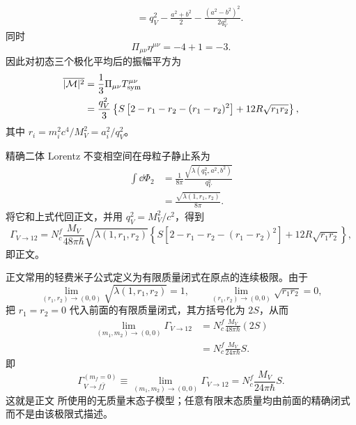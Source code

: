 \begin{derivation}[有质量费米子末态的矢量衰变宽度]
\begin{align*}
 &\quad=q_V^2-\frac{a^2+b^2}{2}
 -\frac{(a^2-b^2)^2}{2q_V^2}.
\end{align*}
同时
\begin{equation*}
 \Pi_{\mu\nu}\eta^{\mu\nu}=-4+1=-3.
\end{equation*}
因此对初态三个极化平均后的振幅平方为
\begin{align*}
 \overline{|\mathcal M|^2}
 &=\frac13\Pi_{\mu\nu}T_{\rm sym}^{\mu\nu}\\
 &=\frac{q_V^2}{3}
 \left\{
 S\left[2-r_1-r_2-(r_1-r_2)^2\right]
 +12R\sqrt{r_1r_2}
 \right\},
\end{align*}
其中 $r_i=m_i^2c^4/M_V^2=a_i^2/q_V^2$。

精确二体 Lorentz 不变相空间在母粒子静止系为
\begin{align*}
 \int\dd\Phi_2
 &=\frac{1}{8\pi}
 \frac{\sqrt{\lambda(q_V^2,a^2,b^2)}}{q_V^2}\\
 &=\frac{\sqrt{\lambda(1,r_1,r_2)}}{8\pi}.
\end{align*}
将它和上式代回正文，并用
$q_V^2=M_V^2/c^2$，得到
\begin{equation*}
 \Gamma_{V\to12}
 =N_c^f\frac{M_V}{48\pi\hbar}\sqrt{\lambda(1,r_1,r_2)}
 \left\{
 S\left[2-r_1-r_2-(r_1-r_2)^2\right]
 +12R\sqrt{r_1r_2}
 \right\},
\end{equation*}
即正文。

正文常用的轻费米子公式定义为有限质量闭式在原点的连续极限。由于
\begin{equation*}
 \lim_{(r_1,r_2)\to(0,0)}\sqrt{\lambda(1,r_1,r_2)}=1,
 \qquad
 \lim_{(r_1,r_2)\to(0,0)}\sqrt{r_1r_2}=0,
\end{equation*}
把 $r_1=r_2=0$ 代入前面的有限质量闭式，其方括号化为 $2S$，从而
\begin{align*}
\lim_{(m_1,m_2)\to(0,0)}\Gamma_{V\to12}
&=N_c^f\frac{M_V}{48\pi\hbar}(2S)\\
&=N_c^f\frac{M_V}{24\pi\hbar}S.
\end{align*}
即
\begin{equation*}
 \boxed{
 \Gamma_{V\to f\bar f}^{(m_f=0)}
 \equiv
 \lim_{(m_1,m_2)\to(0,0)}\Gamma_{V\to12}
 =N_c^f\frac{M_V}{24\pi\hbar}S.}
\end{equation*}
这就是正文 所使用的无质量末态子模型；任意有限末态质量均由前面的精确闭式而不是由该极限式描述。


\end{derivation}
